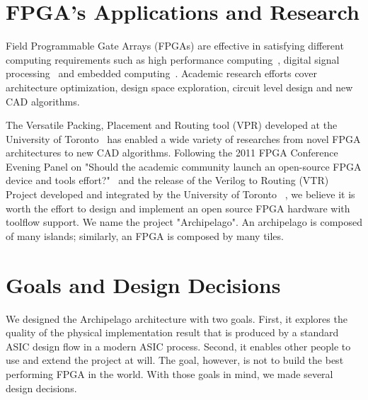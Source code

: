 \section{FPGA's Applications and Research}
\label{sec:fpga_app_res}

Field Programmable Gate Arrays (FPGAs) are effective in satisfying different computing
 requirements such as high performance computing~\cite{Saldana:2010:MPM:1862648.1862652}, 
digital signal processing~\cite{Chang:2005:DAR:1195478} and embedded computing~\cite{xilinx:embedded}. 
 Academic research efforts cover architecture optimization, design space exploration,
circuit level design and new CAD algorithms. \par

The Versatile Packing, Placement and Routing tool (VPR) developed at the University of 
Toronto~\cite{Betz:1997:VNP:647924.738755} has enabled a wide variety of researches
from novel FPGA architectures to new CAD algorithms. Following the 2011 FPGA Conference Evening
 Panel on "Should the academic community launch an open-source FPGA device and tools 
effort?"~\cite{Wawrzynek:2011:ACL:1950413.1950417} and the release of the Verilog to Routing (VTR)
 Project developed and integrated by the University of Toronto ~\cite{Rose:2012:VPA:2145694.2145708}, 
we believe it is worth the effort to design and implement an open source FPGA hardware with toolflow support. 
We name the project "Archipelago". An archipelago is composed of many islands; similarly, 
an FPGA is composed by many tiles. \par

\section{Goals and Design Decisions}
\label{sec:goals}
We designed the Archipelago architecture with two goals. First, it explores the quality of the physical
 implementation result that is produced by a standard ASIC design flow in a modern
ASIC process. Second, it enables other people to use and extend the project at will. 
The goal, however, is not to build the best performing FPGA in the world. With those 
goals in mind, we made several design decisions. \par

